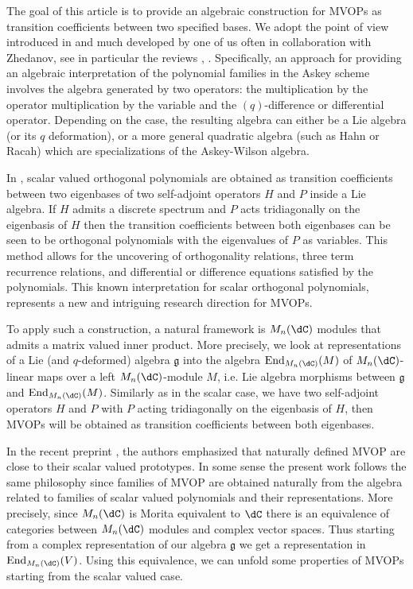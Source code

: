 \documentclass[a4paper,reqno]{amsart}
\DeclareMathOperator\End{ End}
\theoremstyle{definition}
\numberwithin{equation}{section}
\begin{document}
The goal of this article is to provide an algebraic construction for MVOPs as transition coefficients between two specified bases. We adopt the point of view introduced in \cite{GranovskiiZhedanov86} and much developed by one of us often in collaboration with Zhedanov, see in particular the reviews \cite{Genest2014racah}, \cite{De2015bannai}.  Specifically, an approach for providing an algebraic interpretation of the polynomial families in the Askey scheme involves the algebra generated by two operators: the multiplication by the operator multiplication by the variable and the 
$(q)$-difference or differential operator. Depending on the case, the resulting algebra can either be a  Lie algebra (or its $q$ deformation), or a more general quadratic algebra (such as Hahn or Racah) which are specializations of the Askey-Wilson algebra.

In \cite{Floreanini1993quantum,GranovskiiZhedanov86},  scalar valued orthogonal polynomials are obtained as transition coefficients between two eigenbases of two self-adjoint operators $H$ and $P$ inside a Lie algebra. If $H$ admits a discrete spectrum and $P$ acts tridiagonally on the eigenbasis of $H$ then the transition coefficients between both eigenbases can be seen to be orthogonal polynomials with the eigenvalues of $P$ as variables.  This method allows for the uncovering of orthogonality relations, three term recurrence relations, and differential or difference equations satisfied by the polynomials. This known interpretation for scalar orthogonal polynomials, represents a new and intriguing research direction for MVOPs.

To apply such a construction, a natural framework is  $M_n(\dC)$ modules that admits a matrix valued inner product. More precisely, we look at representations of a Lie (and $q$-deformed) algebra $\mathfrak{g}$ into the algebra $\End_{M_n(\dC)}(M)$ of $M_n(\dC)$-linear maps over a left $M_n(\dC)$-module $M$, i.e. Lie algebra morphisms between $\mathfrak{g}$ and $\End_{M_n(\dC)}(M)$. Similarly as in the scalar case, we have two self-adjoint operators $H$ and $P$ with $P$ acting tridiagonally on the eigenbasis of $H$, then MVOPs will be obtained as transition coefficients between both eigenbases. 

In the recent preprint \cite{koelinkromanzudilim24}, the authors emphasized that naturally defined MVOP are close to their scalar valued prototypes. In some sense the present work follows the same philosophy since families of MVOP are obtained naturally from the algebra related to families of scalar valued polynomials and their representations. More precisely, since $M_n(\dC)$ is Morita equivalent to $\dC$ there is an equivalence of categories between $M_n(\dC)$ modules and complex vector spaces. Thus starting from a complex representation of our algebra $\mathfrak{g}$ we get a representation  in $\End_{M_n(\dC)}(V)$.
Using this equivalence, we can unfold some properties of MVOPs starting from the scalar valued case. 
\end{document}

